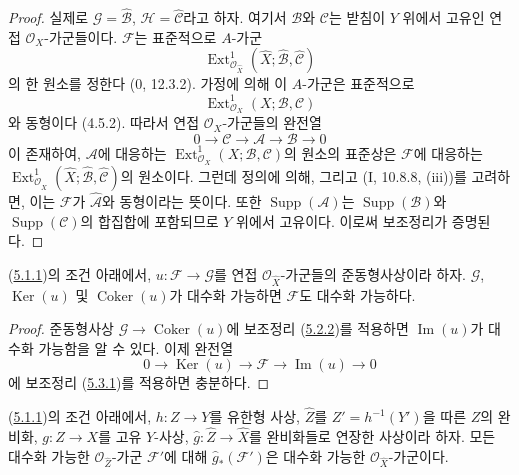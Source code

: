 \begin{proof}
실제로 $\mathcal G=\widehat{\mathcal B}$,
$\mathcal H=\widehat{\mathcal C}$라고 하자. 여기서 $\mathcal B$와
$\mathcal C$는 받침이 $Y$ 위에서 고유인 연접
$\mathcal O_X$-가군들이다. $\mathcal F$는 표준적으로 $A$-가군
\[
\operatorname{Ext}^1_{\mathcal O_{\widehat X}}
(\widehat X;\widehat{\mathcal B},\widehat{\mathcal C})
\]
의 한 원소를 정한다 ($0$, 12.3.2). 가정에 의해 이 $A$-가군은
표준적으로
\[
\operatorname{Ext}^1_{\mathcal O_X}(X;\mathcal B,\mathcal C)
\]
와 동형이다 (4.5.2). 따라서 연접 $\mathcal O_X$-가군들의 완전열
\[
0\to\mathcal C\to\mathcal A\to\mathcal B\to0
\]
이 존재하여, $\mathcal A$에 대응하는
$\operatorname{Ext}^1_{\mathcal O_X}(X;\mathcal B,\mathcal C)$의
원소의 표준상은 $\mathcal F$에 대응하는
$\operatorname{Ext}^1_{\mathcal O_{\widehat X}}
(\widehat X;\widehat{\mathcal B},\widehat{\mathcal C})$의 원소이다.
그런데 정의에 의해, 그리고 (I, 10.8.8, (iii))를 고려하면, 이는
$\mathcal F$가 $\widehat{\mathcal A}$와 동형이라는 뜻이다. 또한
$\operatorname{Supp}(\mathcal A)$는
$\operatorname{Supp}(\mathcal B)$와
$\operatorname{Supp}(\mathcal C)$의 합집합에 포함되므로 $Y$ 위에서
고유이다. 이로써 보조정리가 증명된다.
\end{proof}

\begin{corollary}[5.3.2]
\label{III.5.3.2-fr}
(\hyperref[III.5.1.1-fr]{5.1.1})의 조건 아래에서,
$u:\mathcal F\to\mathcal G$를 연접
$\mathcal O_{\widehat X}$-가군들의 준동형사상이라 하자.
$\mathcal G$, $\operatorname{Ker}(u)$ 및
$\operatorname{Coker}(u)$가 대수화 가능하면 $\mathcal F$도
대수화 가능하다.
\end{corollary}

\begin{proof}
준동형사상 $\mathcal G\to\operatorname{Coker}(u)$에 보조정리
(\hyperref[III.5.2.2-fr]{5.2.2})를 적용하면
$\operatorname{Im}(u)$가 대수화 가능함을 알 수 있다. 이제 완전열
\[
0\to\operatorname{Ker}(u)\to\mathcal F
\to\operatorname{Im}(u)\to0
\]
에 보조정리 (\hyperref[III.5.3.1-fr]{5.3.1})를 적용하면 충분하다.
\end{proof}

\begin{lemma}[5.3.3]
\label{III.5.3.3-fr}
(\hyperref[III.5.1.1-fr]{5.1.1})의 조건 아래에서,
$h:Z\to Y$를 유한형 사상, $\widehat Z$를
$Z'=h^{-1}(Y')$을 따른 $Z$의 완비화, $g:Z\to X$를 고유
$Y$-사상, $\widehat g:\widehat Z\to\widehat X$를 완비화들로
연장한 사상이라 하자. 모든 대수화 가능한
$\mathcal O_{\widehat Z}$-가군 $\mathcal F'$에 대해
$\widehat g_*(\mathcal F')$은 대수화 가능한
$\mathcal O_{\widehat X}$-가군이다.
\end{lemma}

